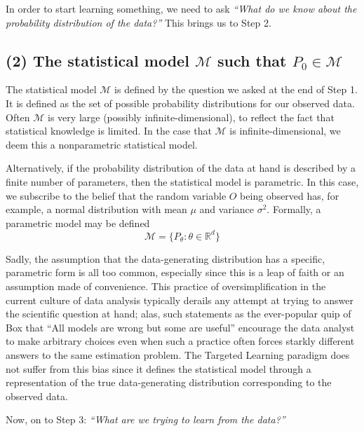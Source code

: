 \documentclass[12pt, krantz2,]{krantz}
\theoremstyle{definition}
\theoremstyle{definition}
\theoremstyle{definition}
\newcommand{\R}{\mathbb{R}}
\newcommand{\M}{\mathcal{M}}
\newcommand{\1}{\mathbbm{1}}
\begin{document}
In order to start learning something, we need to ask \emph{``What do we know about the
probability distribution of the data?''} This brings us to Step 2.

\hypertarget{the-statistical-model-m-such-that-p_0-in-m}{%
\subsection*{\texorpdfstring{(2) The statistical model \(\M\) such that \(P_0 \in \M\)}{(2) The statistical model \textbackslash{}M such that P\_0 \textbackslash{}in \textbackslash{}M}}\label{the-statistical-model-m-such-that-p_0-in-m}}


The statistical model \(\M\) is defined by the question we asked at the end of
Step 1. It is defined as the set of possible probability distributions for our
observed data. Often \(\M\) is very large (possibly infinite-dimensional), to
reflect the fact that statistical knowledge is limited. In the case that \(\M\) is
infinite-dimensional, we deem this a nonparametric statistical model.

Alternatively, if the probability distribution of the data at hand is described
by a finite number of parameters, then the statistical model is parametric. In
this case, we subscribe to the belief that the random variable \(O\) being
observed has, for example, a normal distribution with mean \(\mu\) and variance
\(\sigma^2\). Formally, a parametric model may be defined
\begin{equation*}
  \M = \{P_{\theta} : \theta \in \R^d \}
\end{equation*}

Sadly, the assumption that the data-generating distribution has a specific,
parametric form is all too common, especially since this is a leap of faith or
an assumption made of convenience. This practice of oversimplification in the
current culture of data analysis typically derails any attempt at trying to
answer the scientific question at hand; alas, such statements as the
ever-popular quip of Box that ``All models are wrong but some are useful''
encourage the data analyst to make arbitrary choices even when such a practice
often forces starkly different answers to the same estimation problem. The
Targeted Learning paradigm does not suffer from this bias since it defines the
statistical model through a representation of the true data-generating
distribution corresponding to the observed data.

Now, on to Step 3: \emph{``What are we trying to learn from the data?''}
\end{document}
